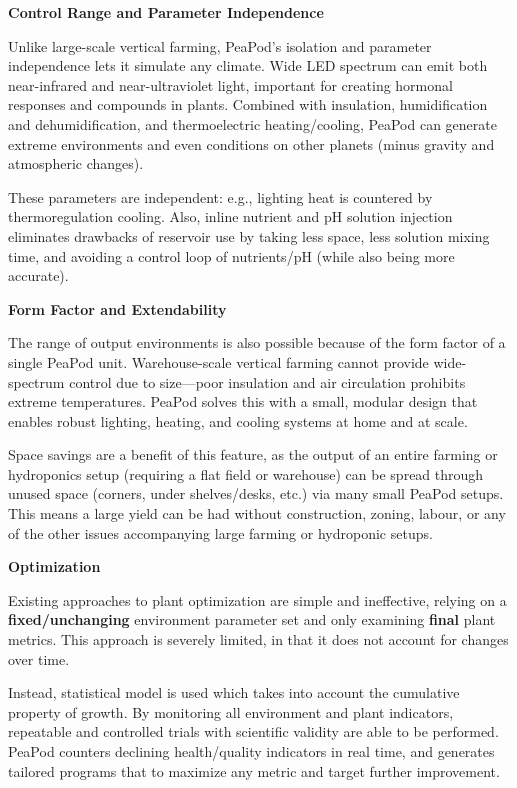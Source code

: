 \textbf{Control Range and Parameter Independence}

Unlike large-scale vertical farming, PeaPod’s isolation and parameter independence lets it simulate any climate. Wide LED spectrum can emit both near-infrared and near-ultraviolet light, important for creating hormonal responses and compounds in plants. Combined with insulation, humidification and dehumidification, and thermoelectric heating/cooling, PeaPod can generate extreme environments and even conditions on other planets (minus gravity and atmospheric changes). 

These parameters are independent: e.g., lighting heat is countered by thermoregulation cooling. Also, inline nutrient and pH solution injection eliminates drawbacks of reservoir use by taking less space, less solution mixing time, and avoiding a control loop of nutrients/pH (while also being more accurate). 


\textbf{Form Factor and Extendability}

The range of output environments is also possible because of the form factor of a single PeaPod unit. Warehouse-scale vertical farming cannot provide wide-spectrum control due to size---poor insulation and air circulation prohibits extreme temperatures. PeaPod solves this with a small, modular design that enables robust lighting, heating, and cooling systems at home and at scale.

Space savings are a benefit of this feature, as the output of an entire farming or hydroponics setup (requiring a flat field or warehouse) can be spread through unused space (corners, under shelves/desks, etc.) via many small PeaPod setups. This means a large yield can be had without construction, zoning, labour, or any of the other issues accompanying large farming or hydroponic setups.

\textbf{Optimization}

Existing approaches to plant optimization are simple and ineffective, relying on a \textbf{fixed/unchanging} environment parameter set and only examining \textbf{final} plant metrics. This approach is severely limited, in that it does not account for changes over time.

Instead, statistical model is used which takes into account the cumulative property of growth. By monitoring all environment and plant indicators, repeatable and controlled trials with scientific validity are able to be performed. PeaPod counters declining health/quality indicators in real time, and generates tailored programs that to maximize any metric and target further improvement.

